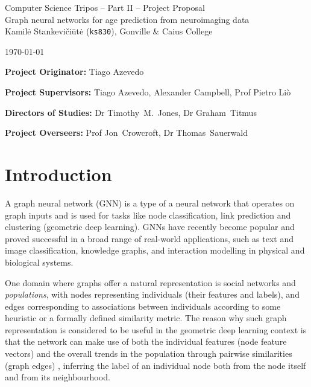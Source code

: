 \documentclass[12pt,a4paper,twoside]{article}
\begin{document}
\begin{center}
\Large
Computer Science Tripos -- Part II -- Project Proposal\\[4mm]
\LARGE
Graph neural networks for age prediction from neuroimaging data \\[4mm]

\large
Kamilė Stankevičiūtė (\texttt{ks830}), Gonville \& Caius College

\today %
\end{center}

\vspace{5mm}
\textbf{Project Originator:} Tiago Azevedo

\textbf{Project Supervisors:} Tiago Azevedo, Alexander Campbell, Prof Pietro Liò

\textbf{Directors of Studies:} Dr Timothy~M.~Jones, Dr Graham~Titmus

\textbf{Project Overseers:} Prof Jon~Crowcroft, Dr Thomas~Sauerwald


\section*{Introduction}


A graph neural network (GNN) is a type of a neural network that operates on graph inputs and is used for tasks like node classification, link prediction and clustering (geometric deep learning). GNNs have recently become popular and proved successful in a broad range of real-world applications, such as text and image classification, knowledge graphs, and interaction modelling in physical and biological systems. \cite{zhou2018gnn}

One domain where graphs offer a natural representation is social networks and \textit{populations}, with nodes representing individuals (their features and labels), and edges corresponding to associations between individuals according to some heuristic or a formally defined similarity metric. The reason why such graph representation is considered to be useful in the geometric deep learning context is that the network can make use of both the individual features (node feature vectors) and the overall trends in the population through pairwise similarities (graph edges) \cite{parisot2017spectral}, inferring the label of an individual node both from the node itself and from its neighbourhood.
\end{document}
